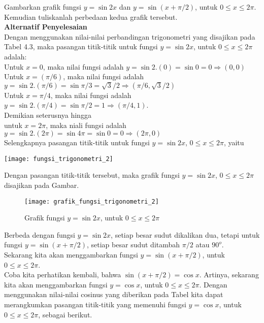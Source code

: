 \documentclass[11pt,fleqn]{book} %
\begin{document}
\begin{enumerate}
\begin{example}
Gambarkan grafik fungsi $y = \sin 2x$ dan $y = \sin (x+\pi/2)$, untuk $0 \leq x\leq 2\pi$. Kemudian tuliskanlah perbedaan kedua grafik tersebut.\\

\textbf{Alternatif Penyelesaian}\\
Dengan menggunakan nilai-nilai perbandingan trigonometri yang disajikan pada Tabel 4.3, maka pasangan titik-titik untuk fungsi $y = \sin 2x$, untuk $0 \leq x\leq 2\pi$ adalah:\\
Untuk $x = 0$, maka nilai fungsi adalah $y = \sin 2.(0) = \sin 0 = 0 \Rightarrow (0, 0)$\\
Untuk $x = (\pi/6)$, maka nilai fungsi adalah $y = \sin 2. (\pi/6) = \sin \pi/3 = \sqrt{3}/2 \Rightarrow(\pi/6,\sqrt{3}/2)$\\
Untuk $x = \pi/4$, maka nilai fungsi adalah $y = \sin 2. (\pi/4) = \sin \pi/2 = 1 \Rightarrow(\pi/4,1)$.\\
Demikian seterusnya hingga\\
untuk $x = 2\pi$, maka niali fungsi adalah $y = \sin 2.(2\pi) = \sin 4\pi = \sin 0 = 0 \Rightarrow (2\pi, 0)$\\
Selengkapnya pasangan titik-titik untuk fungsi $y = \sin 2x$, $0 \leq x\leq 2\pi$, yaitu

\texttt{[image: fungsi\_trigonometri\_2]}

Dengan  pasangan titik-titik tersebut, maka grafik fungsi $y = \sin 2x$, $0 \leq x\leq 2\pi$ disajikan pada Gambar.\\

\begin{figure}[!ht]
\begin{center}
\texttt{[image: grafik\_fungsi\_trigonometri\_2]} 
\caption{Grafik fungsi $y = \sin 2x$, untuk $0 \leq x\leq 2\pi$}
\end{center}
\end{figure}

Berbeda dengan fungsi $y = \sin 2x$, setiap besar sudut dikalikan dua, tetapi untuk fungsi $y = \sin(x+\pi/2)$, setiap besar sudut ditambah $\pi/2$ atau $90^o$.\\
Sekarang kita akan menggambarkan fungsi $y = \sin(x+\pi/2)$, untuk $0 \leq x\leq 2\pi$.\\
Coba kita perhatikan kembali, bahwa $\sin(x+\pi/2) = \cos x$. Artinya, sekarang kita akan menggambarkan fungsi $y = \cos x$, untuk $0 \leq x\leq 2\pi$. Dengan menggunakan nilai-nilai cosinus yang diberikan pada Tabel kita dapat merangkumkan pasangan titik-titik  yang memenuhi fungsi $y = \cos x$, untuk $0 \leq x\leq 2\pi$, sebagai berikut.


\end{example}
\end{enumerate}
\end{document}
